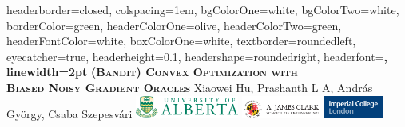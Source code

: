 \documentclass[portrait,a0paper,fontscale=0.285]{baposter} %
\begin{document}
\begin{poster}
{
headerborder=closed, %
colspacing=1em, %
bgColorOne=white, %
bgColorTwo=white, %
borderColor=green, %
headerColorOne=olive, %
headerColorTwo=green, %
headerFontColor=white, %
boxColorOne=white, %
textborder=roundedleft, %
eyecatcher=true, %
headerheight=0.1\textheight, %
headershape=roundedright, %
headerfont=\Large\bf\textsc, %
linewidth=2pt %
}
%
{}
{\bf\textsc{(Bandit) Convex Optimization with\\ Biased Noisy Gradient Oracles}\vspace{0.2em}} %
{ Xiaowei  Hu, Prashanth L A, Andr\'as Gy\"orgy, Csaba Szepesv\'ari } %
{\includegraphics[height=2em]{u-of-alberta-logo.pdf}
\hspace{12pt}
\includegraphics[height=2em]{clark.png}
\hspace{12pt}
\includegraphics[height=2em]{icl.png}} %




\end{poster}
\end{document}
